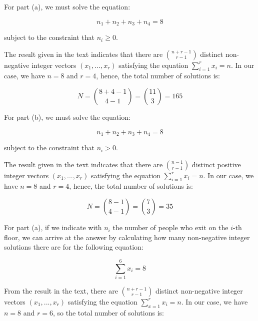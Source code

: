 \documentclass[a4paper,12pt]{article}
\begin{document}
For part (a), we must solve the equation:

\[ n_1 + n_2 + n_3 + n_4 = 8\]

\noindent 
subject to the constraint that $n_i \ge 0$. 

The result given in the text indicates that there are $\binom{n+r-1}{r-1}$ distinct non-negative integer vectors $(x_1,...,x_r)$ satisfying the equation $\sum_{i=1}^r x_i = n$. In our case, we have $n=8$ and $r=4$, hence, the total number of solutions is:

\[ N = \binom{8+4-1}{4-1} = \binom{11}{3} = 165 \]

\vspace{2mm}
For part (b), we must solve the equation:

\[ n_1 + n_2 + n_3 + n_4 = 8\]

\noindent
subject to the constraint that $n_i > 0$.

The result given in the text indicates that there are $\binom{n-1}{r-1}$ distinct positive integer vectors $(x_1,...,x_r)$ satisfying the equation $\sum_{i=1}^r x_i = n$. In our case, we have $n=8$ and $r=4$, hence, the total number of solutions is:

\[ N = \binom{8-1}{4-1} = \binom{7}{3} = 35 \]

\vspace{4mm}

For part (a), if we indicate with $n_i$ the number of people who exit on the $i$-th floor, we can arrive at the answer by calculating how many non-negative integer solutions there are for the following equation:

\[ \sum_{i=1}^6 x_i = 8 \]

From the result in the text, there are $\binom{n+r-1}{r-1}$ distinct non-negative integer vectors $(x_1, ..., x_r)$ satisfying the equation $\sum_{x=1}^r x_i = n$. In our case, we have $n=8$ and $r=6$, so the total number of solutions is:
\end{document}
